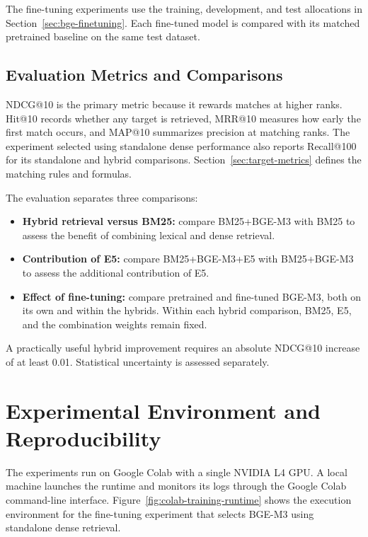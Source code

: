 The fine-tuning experiments use the training, development, and test allocations in Section~\ref{sec:bge-finetuning}. Each fine-tuned model is compared with its matched pretrained baseline on the same test dataset.

\subsection{Evaluation Metrics and Comparisons}

NDCG@10 is the primary metric because it rewards matches at higher ranks. Hit@10 records whether any target is retrieved, MRR@10 measures how early the first match occurs, and MAP@10 summarizes precision at matching ranks. The experiment selected using standalone dense performance also reports Recall@100 for its standalone and hybrid comparisons. Section~\ref{sec:target-metrics} defines the matching rules and formulas.

The evaluation separates three comparisons:
\begin{itemize}
    \item \textbf{Hybrid retrieval versus BM25:} compare BM25+BGE-M3 with BM25 to assess the benefit of combining lexical and dense retrieval.
    \item \textbf{Contribution of E5:} compare BM25+BGE-M3+E5 with BM25+BGE-M3 to assess the additional contribution of E5.
    \item \textbf{Effect of fine-tuning:} compare pretrained and fine-tuned BGE-M3, both on its own and within the hybrids. Within each hybrid comparison, BM25, E5, and the combination weights remain fixed.
\end{itemize}
A practically useful hybrid improvement requires an absolute NDCG@10 increase of at least 0.01. Statistical uncertainty is assessed separately.



\section{Experimental Environment and Reproducibility}
\label{sec:experimental-environment}

The experiments run on Google Colab with a single NVIDIA L4 GPU. A local machine launches the runtime and monitors its logs through the Google Colab command-line interface. Figure~\ref{fig:colab-training-runtime} shows the execution environment for the fine-tuning experiment that selects BGE-M3 using standalone dense retrieval.

